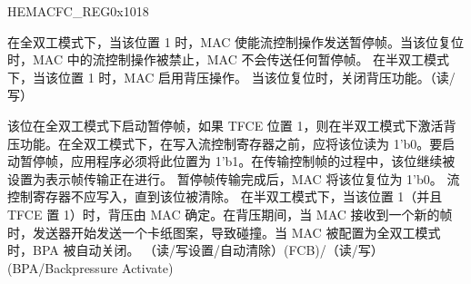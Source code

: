 \begin{register}{H}{EMACFC\_REG}{0x1018}
\begin{regdesc}
\begin{reglist}
\item [TFCE] 在全双工模式下，当该位置 1 时，MAC 使能流控制操作发送暂停帧。当该位复位时，MAC 中的流控制操作被禁止，MAC 不会传送任何暂停帧。 在半双工模式下，当该位置 1 时，MAC 启用背压操作。 当该位复位时，关闭背压功能。（读/写）
\item [FCBBA]
该位在全双工模式下启动暂停帧，如果 TFCE 位置 1，则在半双工模式下激活背压功能。在全双工模式下，在写入流控制寄存器之前，应将该位读为 1'b0。要启动暂停帧，应用程序必须将此位置为 1'b1。在传输控制帧的过程中，该位继续被设置为表示帧传输正在进行。 暂停帧传输完成后，MAC 将该位复位为 1'b0。 流控制寄存器不应写入，直到该位被清除。 在半双工模式下，当该位置 1（并且 TFCE 置 1）时，背压由 MAC 确定。在背压期间，当 MAC 接收到一个新的帧时，发送器开始发送一个卡纸图案，导致碰撞。当 MAC 被配置为全双工模式时，BPA 被自动关闭。 （读/写设置/自动清除）(FCB)/（读/写）(BPA/Backpressure Activate)
\end{reglist}\end{regdesc}
\end{register}


